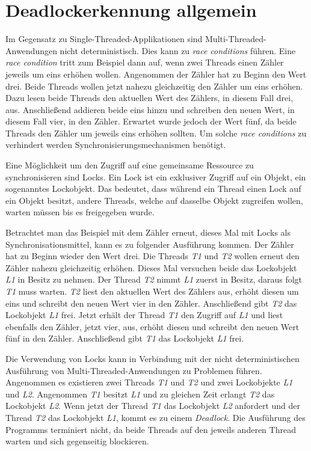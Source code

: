 \section{Deadlockerkennung allgemein}
\label{section:Deadlockerkennung allgemein}
Im Gegensatz zu Single-Threaded-Applikationen sind Multi-Threaded-Anwendungen
nicht deterministisch. Dies kann zu \textit{race conditions} führen. Eine
\textit{race condition} tritt zum Beispiel dann auf, wenn zwei Threads einen
Zähler jeweils um eins erhöhen wollen. Angenommen der Zähler hat zu Beginn den
Wert drei. Beide Threads wollen jetzt nahezu gleichzeitig den Zähler um eins
erhöhen. Dazu lesen beide Threads den aktuellen Wert des Zählers, in diesem Fall
drei, aus. Anschließend addieren beide eins hinzu und schreiben den neuen Wert,
in diesem Fall vier, in den Zähler. Erwartet wurde jedoch der Wert fünf, da
beide Threads den Zähler um jeweils eins erhöhen sollten. Um solche \textit{race
conditions} zu verhindert werden Synchronisierungsmechanismen benötigt.

Eine Möglichkeit um den Zugriff auf eine gemeinsame Ressource zu synchronisieren
sind Locks. Ein Lock ist ein exklusiver Zugriff auf ein Objekt, ein sogenanntes
Lockobjekt. Das bedeutet, dass während ein Thread einen Lock auf ein Objekt
besitzt, andere Threads, welche auf dasselbe Objekt zugreifen wollen, warten
müssen bis es freigegeben wurde.

Betrachtet man das Beispiel mit dem Zähler erneut, dieses Mal mit Locks als
Synchronisationsmittel, kann es zu folgender Ausführung kommen. Der Zähler hat
zu Beginn wieder den Wert drei. Die Threads \textit{T1} und \textit{T2} wollen
erneut den Zähler nahezu gleichzeitig erhöhen. Dieses Mal versuchen beide das
Lockobjekt \textit{L1} in Besitz zu nehmen. Der Thread \textit{T2} nimmt
\textit{L1} zuerst in Besitz, daraus folgt \textit{T1} muss warten. \textit{T2}
liest den aktuellen Wert des Zählers aus, erhöht diesen um eins und schreibt den
neuen Wert vier in den Zähler. Anschließend gibt \textit{T2} das Lockobjekt
\textit{L1} frei. Jetzt erhält der Thread \textit{T1} den Zugriff auf
\textit{L1} und liest ebenfalls den Zähler, jetzt vier, aus, erhöht diesen und
schreibt den neuen Wert fünf in den Zähler. Anschließend gibt \textit{T1} das
Lockobjekt \textit{L1} frei.

Die Verwendung von Locks kann in Verbindung mit der nicht deterministischen
Ausführung von Multi-Threaded-Anwendungen zu Problemen führen. Angenommen es
existieren zwei Threads \textit{T1} und \textit{T2} und zwei Lockobjekte
\textit{L1} und \textit{L2}. Angenommen \textit{T1} besitzt \textit{L1} und zu
gleichen Zeit erlangt \textit{T2} das Lockobjekt \textit{L2}. Wenn jetzt der
Thread \textit{T1} das Lockobjekt \textit{L2} anfordert und der Thread
\textit{T2} das Lockobjekt \textit{L1}, kommt es zu einem \textit{Deadlock}. Die
Ausführung des Programms terminiert nicht, da beide Threads auf den jeweils
anderen Thread warten und sich gegenseitig blockieren.

